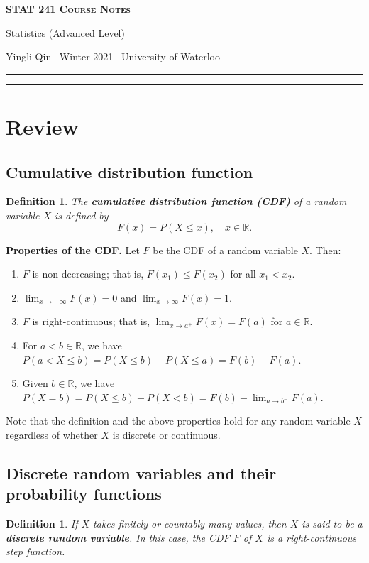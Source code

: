 \documentclass[10pt]{article}
\newcommand{\R}{\mathbb{R}}
\newcommand{\newtitle}[4]{
  \begin{center}
	\huge{\textbf{\textsc{#1 Course Notes}}}
    
	\large{\sc #2}
    
	{\sc #3 \textbullet\, #4 \textbullet\, University of Waterloo}
	\normalsize\vspace{1cm}\hrule
  \end{center}
}
\theoremstyle{newstyle}
\newtheorem{defn}[thm]{Definition}
\begin{document}
\pagestyle{fancy}
\newtitle{STAT 241}{Statistics (Advanced Level)}{Yingli Qin}{Winter 2021}

\tableofcontents
\vspace{1cm}\hrule
{}
\newpage 

\section{Review}

\subsection{Cumulative distribution function}

\begin{defn} 
The {\bf cumulative distribution function (CDF)} of a random variable $X$ is defined by 
\[ F(x) = P(X \leq x), \quad x \in \R. \]
\end{defn}
{\bf Properties of the CDF.} Let $F$ be the CDF of a random variable $X$. Then:
\begin{enumerate}[(1)]
    \item $F$ is non-decreasing; that is, $F(x_1) \leq F(x_2)$ for all $x_1 < x_2$. 
    \item $\lim_{x\to-\infty} F(x) = 0$ and $\lim_{x\to\infty} F(x) = 1$.
    \item $F$ is right-continuous; that is, $\lim_{x\to a^+} F(x) = F(a)$ for $a \in \R$.
    \item For $a < b \in \R$, we have $P(a < X \leq b) = P(X \leq b) - P(X \leq a) = F(b) - F(a)$.
    \item Given $b \in \R$, we have $P(X = b) = P(X \leq b) - P(X < b) = F(b) - \lim_{a\to b^-} F(a)$.
\end{enumerate}

Note that the definition and the above properties hold for any random variable $X$ regardless of 
whether $X$ is discrete or continuous.

\subsection{Discrete random variables and their probability functions}

\begin{defn}
If $X$ takes finitely or countably many values, then $X$ is said to be a {\bf discrete random variable}.
In this case, the CDF $F$ of $X$ is a right-continuous step function.
\end{defn}
\end{document}
